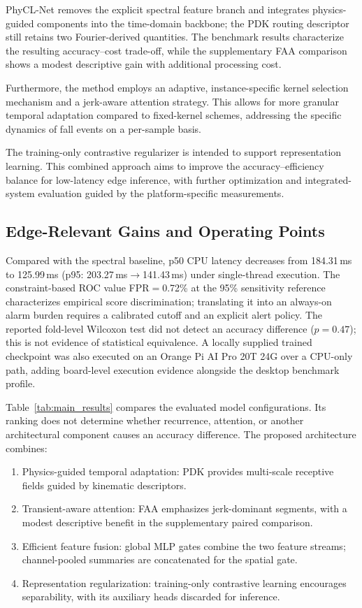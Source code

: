 \documentclass[jec]{acnsart}
\begin{document}
PhyCL-Net removes the explicit spectral feature branch and integrates physics-guided components into the time-domain backbone; the PDK routing descriptor still retains two Fourier-derived quantities. The benchmark results characterize the resulting accuracy--cost trade-off, while the supplementary FAA comparison shows a modest descriptive gain with additional processing cost.

Furthermore, the method employs an adaptive, instance-specific kernel selection mechanism and a jerk-aware attention strategy. This allows for more granular temporal adaptation compared to fixed-kernel schemes, addressing the specific dynamics of fall events on a per-sample basis.

The training-only contrastive regularizer is intended to support representation learning. This combined approach aims to improve the accuracy--efficiency balance for low-latency edge inference, with further optimization and integrated-system evaluation guided by the platform-specific measurements.

\subsection{Edge-Relevant Gains and Operating Points}

Compared with the spectral baseline, p50 CPU latency decreases from 184.31\,ms to 125.99\,ms (p95: 203.27\,ms${\rightarrow}$141.43\,ms) under single-thread execution. The constraint-based ROC value FPR${=}$0.72\% at the 95\% sensitivity reference characterizes empirical score discrimination; translating it into an always-on alarm burden requires a calibrated cutoff and an explicit alert policy. The reported fold-level Wilcoxon test did not detect an accuracy difference ($p{=}0.47$); this is not evidence of statistical equivalence. A locally supplied trained checkpoint was also executed on an Orange Pi AI Pro 20T 24G over a CPU-only path, adding board-level execution evidence alongside the desktop benchmark profile.

Table~\ref{tab:main_results} compares the evaluated model configurations. Its ranking does not determine whether recurrence, attention, or another architectural component causes an accuracy difference. The proposed architecture combines:
\begin{enumerate}
\item Physics-guided temporal adaptation: PDK provides multi-scale receptive fields guided by kinematic descriptors.
\item Transient-aware attention: FAA emphasizes jerk-dominant segments, with a modest descriptive benefit in the supplementary paired comparison.
\item Efficient feature fusion: global MLP gates combine the two feature streams; channel-pooled summaries are concatenated for the spatial gate.
\item Representation regularization: training-only contrastive learning encourages separability, with its auxiliary heads discarded for inference.
\end{enumerate}
\end{document}
